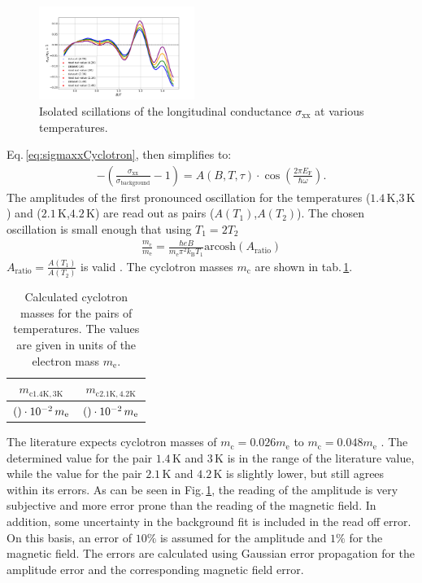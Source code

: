 \begin{figure}[h]
    \centering
    \includegraphics[width=0.45\textwidth]{../Images/reducedSigma.png}
    \caption{Isolated scillations of the longitudinal conductance $\sigma_\text{xx}$ at various temperatures.}
    \label{fig:oscillationsCyclotron}
\end{figure}
Eq.\,\ref{eq:sigmaxxCyclotron}, then simplifies to:
\begin{align}
    -(\frac{\sigma_\text{xx}}{\sigma_\text{background}}-1)= A(B,T,\tau)\cdot\cos{\left(\frac{2\pi E_\text{F}}{\hbar\omega}\right)}.
    \label{eq:onlyOscillation}
\end{align}
The amplitudes of the first pronounced oscillation for the temperatures ($1.4\,\text{K}$,$3\,\text{K}$) and ($2.1\,\text{K}$,$4.2\,\text{K}$) are read out as pairs ($A(T_1)$,$A(T_2)$).
The chosen oscillation is small enough that using $T_1 = 2T_2$ 
\begin{align}
    \frac{m_\text{c}}{m_\text{e}}=\frac{\hbar eB}{m_\text{e}\pi^2k_\text{B}T_1}\text{arcosh}\left(A_\text{ratio}\right)\label{mc/me}
\end{align}
$A_\text{ratio}=\frac{A(T_1)}{A(T_2)}$ is valid \cite{Tasksheet}.
The cyclotron masses $m_\text{c}$ are shown in tab.\,\ref{tab:cyclotronMass}.
\begin{table}[h]
    \centering
    \begin{tabular}{c|c}
        \hline\hline
        $m_{\text{c}1.4\text{K},3\text{K}}$ & $m_{\text{c}2.1\text{K},4.2\text{K}}$ \\\hline
        $(\csname cyclotron15\endcsname)\cdot 10^{-2}\,m_\text{e}$& $(\csname cyclotron21\endcsname)\cdot10^{-2}\,m_\text{e}$ \\
        \hline\hline
    \end{tabular}
    \caption{Calculated cyclotron masses for the pairs of temperatures. The values are given in units of the electron mass $m_\text{e}$. \label{tab:cyclotronMass}}
\end{table}
The literature expects cyclotron masses of $m_\text{c}= 0.026m_\text{e}$ to $m_\text{c}= 0.048m_\text{e}$ \cite{Xhang}.
The determined value for the pair $1.4\,\text{K}$ and $3\,\text{K}$ is in the range of the literature value, while the value for the pair $2.1\,\text{K}$ and $4.2\,\text{K}$ is slightly lower, but still agrees within its errors.
As can be seen in Fig.\,\ref{fig:oscillationsCyclotron}, the reading of the amplitude is very subjective and more error prone than the reading of the magnetic field.
In addition, some uncertainty in the background fit is included in the read off error.
On this basis, an error of $10\%$ is assumed for the amplitude and $1\%$ for the magnetic field.
The errors are calculated using Gaussian error propagation for the amplitude error and the corresponding magnetic field error.
